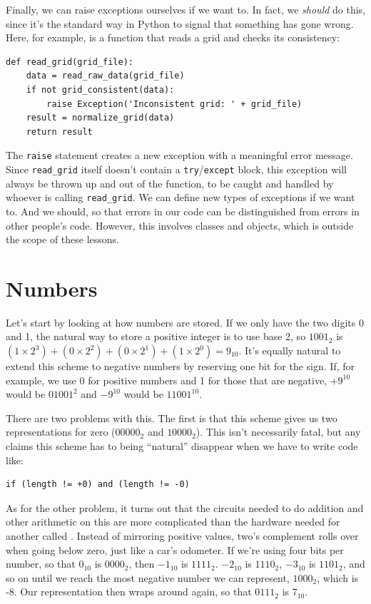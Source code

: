 \documentclass{book}
\begin{document}
Finally, we can raise exceptions ourselves if we want to. In fact, we
\emph{should} do this, since it's the standard way in Python to signal
that something has gone wrong. Here, for example, is a function that
reads a grid and checks its consistency:

\begin{verbatim}
def read_grid(grid_file):
    data = read_raw_data(grid_file)
    if not grid_consistent(data):
        raise Exception('Inconsistent grid: ' + grid_file)
    result = normalize_grid(data)
    return result
\end{verbatim}

The \texttt{raise} statement creates a new exception with a meaningful
error message. Since \texttt{read\_grid} itself doesn't contain a
\texttt{try}/\texttt{except} block, this exception will always be thrown
up and out of the function, to be caught and handled by whoever is
calling \texttt{read\_grid}. We can define new types of exceptions if we
want to. And we should, so that errors in our code can be distinguished
from errors in other people's code. However, this involves classes and
objects, which is outside the scope of these lessons.

\section{Numbers}

Let's start by looking at how numbers are stored. If we only have the
two digits 0 and 1, the natural way to store a positive integer is to
use base 2, so $1001_{2}$ is
$(1×2^{3})+(0×2^{2})+(0×2^{1})+(1×2^{0}) = 9_{10}$.
It's equally natural to extend this scheme to
negative numbers by reserving one bit for the sign. If, for example, we
use 0 for positive numbers and 1 for those that are negative,
$+9^{10}$ would be $01001^{2}$ and
$-9^{10}$ would be $11001^{10}$.

There are two problems with this. The first is that this scheme gives us
two representations for zero ($00000_{2}$ and
$10000_{2}$). This isn't necessarily fatal, but any claims
this scheme has to being ``natural'' disappear when we have to write
code like:

\begin{verbatim}
if (length != +0) and (length != -0)
\end{verbatim}

As for the other problem, it turns out that the circuits needed to do
addition and other arithmetic on this
 are
more complicated than the hardware needed for another called
. Instead of mirroring
positive values, two's complement rolls over when going below zero, just
like a car's odometer. If we're using four bits per number, so that
$0_{10}$ is $0000_{2}$, then $-1_{10}$
is $1111_{2}$. $-2_{10}$ is $1110_{2}$,
$-3_{10}$ is $1101_{2}$, and so on until we reach
the most negative number we can represent, $1000_{2}$, which
is -8. Our representation then wraps around again, so that
$0111_{2}$ is $7_{10}$.
\end{document}
